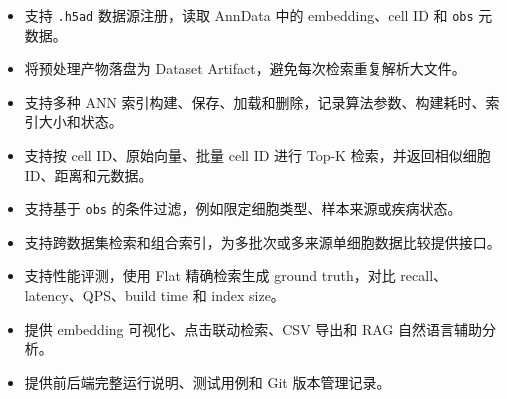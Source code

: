 \documentclass[UTF8,a4paper,12pt]{ctexrep}
\begin{document}
\begin{itemize}
  \item 支持 \texttt{.h5ad} 数据源注册，读取 AnnData 中的 embedding、cell ID 和 \texttt{obs} 元数据。
  \item 将预处理产物落盘为 Dataset Artifact，避免每次检索重复解析大文件。
  \item 支持多种 ANN 索引构建、保存、加载和删除，记录算法参数、构建耗时、索引大小和状态。
  \item 支持按 cell ID、原始向量、批量 cell ID 进行 Top-K 检索，并返回相似细胞 ID、距离和元数据。
  \item 支持基于 \texttt{obs} 的条件过滤，例如限定细胞类型、样本来源或疾病状态。
  \item 支持跨数据集检索和组合索引，为多批次或多来源单细胞数据比较提供接口。
  \item 支持性能评测，使用 Flat 精确检索生成 ground truth，对比 recall、latency、QPS、build time 和 index size。
  \item 提供 embedding 可视化、点击联动检索、CSV 导出和 RAG 自然语言辅助分析。
  \item 提供前后端完整运行说明、测试用例和 Git 版本管理记录。
\end{itemize}
\end{document}
